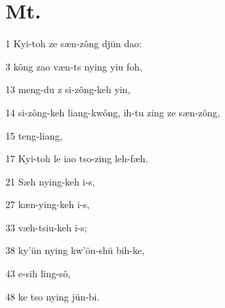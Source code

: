 \section{Mt.}%

\begin{sAbstract}
	\item[1] Kyi-toh ze sæn-zông djün dao:
	\item[3] kông zao væn-ts nying yiu foh,
	\item[13] meng-du z si-zông-keh yin,
	\item[14] si-zông-keh liang-kwông, ih-tu zing ze sæn-zông,
	\item[15] teng-liang,
	\item[17] Kyi-toh le iao tso-zing leh-fæh.
	\item[21] Sæh nying-keh i-s,
	\item[27] kæn-ying-keh i-s,
	\item[33] væh-tsiu-keh i-s;
	\item[38] ky'ün nying kw'ön-shü bih-ke,
	\item[43] e-sih ling-sô,
	\item[48] ke tso nying jün-bi.
\end{sAbstract}

